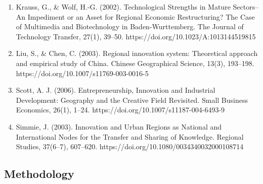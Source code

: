 \documentclass[a4paper,11pt]{article}
\begin{document}
\begin{enumerate}
\item Krauss, G., \& Wolf, H.-G. (2002). Technological Strengths in Mature Sectors--An Impediment or an Asset for Regional Economic Restructuring? The Case of Multimedia and Biotechnology in Baden-Wurttemberg. The Journal of Technology Transfer, 27(1), 39–50. https://doi.org/10.1023/A:1013144519815
\item Liu, S., \& Chen, C. (2003). Regional innovation system: Theoretical approach and empirical study of China. Chinese Geographical Science, 13(3), 193–198. https://doi.org/10.1007/s11769-003-0016-5
\item Scott, A. J. (2006). Entrepreneurship, Innovation and Industrial Development: Geography and the Creative Field Revisited. Small Business Economics, 26(1), 1–24. https://doi.org/10.1007/s11187-004-6493-9
\item Simmie, J. (2003). Innovation and Urban Regions as National and International Nodes for the Transfer and Sharing of Knowledge. Regional Studies, 37(6–7), 607–620. https://doi.org/10.1080/0034340032000108714
\end{enumerate}

\subsection{Methodology}
\end{document}
